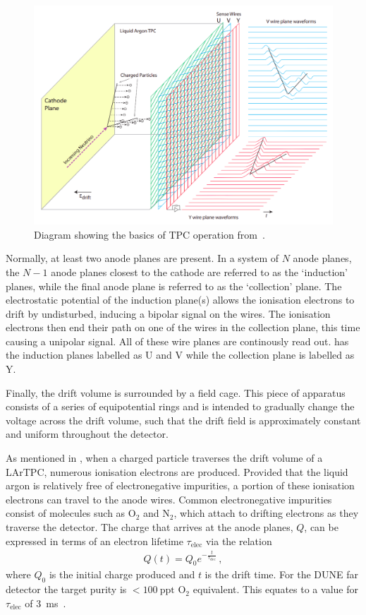 \begin{figure}[h]
  \centering
  \includegraphics[width=.8\linewidth]{files/figures/dune_detector/tpcOperation}
  \caption[Diagram showing the basics of TPC operation.]{Diagram showing the basics of TPC operation from~\cite{uBooneConstruct}.}
  \label{fig:tpcOperation}
\end{figure}

Normally, at least two anode planes are present.
In a system of $N$ anode planes, the $N-1$ anode planes closest to the cathode are referred to as the `induction' planes, while the final anode plane is referred to as the `collection' plane.
The electrostatic potential of the induction plane(s) allows the ionisation electrons to drift by undisturbed, inducing a bipolar signal on the wires.
The ionisation electrons then end their path on one of the wires in the collection plane, this time causing a unipolar signal.
All of these wire planes are continously read out.
 has the induction planes labelled as U and V while the collection plane is labelled as Y.

Finally, the drift volume is surrounded by a field cage.
This piece of apparatus consists of a series of equipotential rings and is intended to gradually change the voltage across the drift volume, such that the drift field is approximately constant and uniform throughout the detector.

As mentioned in , when a charged particle traverses the drift volume of a LArTPC, numerous ionisation electrons are produced.
Provided that the liquid argon is relatively free of electronegative impurities, a portion of these ionisation electrons can travel to the anode wires.
Common electronegative impurities consist of molecules such as $\text{O}_{2}$ and $\text{N}_{2}$, which attach to drifting electrons as they traverse the detector.
The charge that arrives at the anode planes, $Q$, can be expressed in terms of an electron lifetime $\tau_{\text{elec}}$ via the relation
\begin{align}
  Q(t) = Q_{0} e^{-\frac{t}{\tau_{\text{elec}}}} \, ,
\end{align}
where $Q_{0}$ is the initial charge produced and $t$ is the drift time.
For the DUNE far detector the target purity is $<100~\text{ppt}$ $\text{O}_{2}$ equivalent.
This equates to a value for $\tau_{\text{elec}}$ of \SI{3}{\milli\second}~\cite{tdrVol1}.

